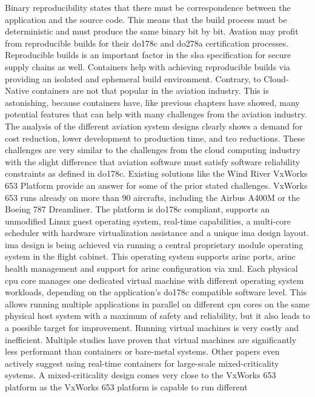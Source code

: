\documentclass[titlepage]{report}
\begin{document}
Binary reproducibility states that there must be correspondence between the application and the source code\cite{binaryRepro}. This means that the build process must be deterministic and must produce the same binary bit by bit. Avation
may profit from reproducible builds for their \gls{do178c} and \gls{do278a} certification processes. Reproducible builds is an important factor in the \gls{slsa} specification for secure supply chains as well. Containers help with achieving
reproducible builds via providing an isolated and ephemeral build environment. Contrary, to Cloud-Native containers are not that popular in the aviation industry. This is astonishing, because containers have, like previous chapters have showed,
many potential features that can help with many challenges from the aviation industry. The analysis of the different aviation system designs clearly shows a demand for cost reduction, lower development to production time,
and \gls{tco} reductions. These challenges are very similar to the challenges from the cloud computing industry with the slight difference that aviation software must satisfy software reliability constraints as defined in \gls{do178c}.
Existing solutions like the Wind River VxWorks 653 Platform provide an answer for some of the prior stated challenges. VxWorks 653 runs already on more than 90 aircrafts, including the Airbus A400M or the Boeing 787 Dreamliner\cite{VXWorks653}.
The platform is \gls{do178c} compliant, supports an unmodified Linux guest operating system, real-time capabilities, a multi-core scheduler with hardware virtualization assistance and a unique \gls{ima} design layout\cite{VXWorks653Platform}.
\gls{ima} design is being achieved via running a central proprietary module operating system in the flight cabinet. This operating system supports \gls{arinc} ports, \gls{arinc} health management and support for \gls{arinc} configuration via
\gls{xml}. Each physical \gls{cpu} core manages one dedicated virtual machine with different operating system workloads, depending on the application's \gls{do178c} compatible software level. This allows running multiple applications
in parallel on different \gls{cpu} cores on the same physical host system with a maximum of safety and reliability, but it also leads to a possible target for improvement. Running virtual machines is very costly and inefficient. Multiple studies
have proven that virtual machines are significantly less performant than containers or bare-metal systems\cite{seo2014performance}\cite{felter2015updated}. 
Other papers even actively suggest using real-time containers for large-scale mixed-criticality systems\cite{cinque2017work}. A mixed-criticality design comes very close to the VxWorks 653 platform as the VxWorks 653 platform is capable to run different
\end{document}
